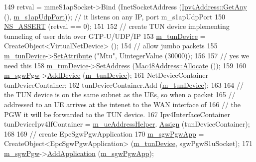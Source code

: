\begin{DoxyCode}
149   retval = mmeS1apSocket->Bind (InetSocketAddress (\hyperlink{classns3_1_1Ipv4Address_a7a39b330c8e701183a411d5779fca1a4}{Ipv4Address::GetAny} (), 
      \hyperlink{classns3_1_1EmuEpcHelper_a40b9bb46dee69ea02ffe0722b462db8e}{m\_s1apUdpPort})); \textcolor{comment}{// it listens on any IP, port m\_s1apUdpPort}
150   \hyperlink{assert_8h_a6dccdb0de9b252f60088ce281c49d052}{NS\_ASSERT} (retval == 0);
151 
152   \textcolor{comment}{// create TUN device implementing tunneling of user data over GTP-U/UDP/IP }
153   \hyperlink{classns3_1_1EmuEpcHelper_ababd4c0bb2cb44e0194c852e6411b501}{m\_tunDevice} = CreateObject<VirtualNetDevice> ();
154   \textcolor{comment}{// allow jumbo packets}
155   \hyperlink{classns3_1_1EmuEpcHelper_ababd4c0bb2cb44e0194c852e6411b501}{m\_tunDevice}->\hyperlink{classns3_1_1ObjectBase_ac60245d3ea4123bbc9b1d391f1f6592f}{SetAttribute} (\textcolor{stringliteral}{"Mtu"}, UintegerValue (30000));
156 
157   \textcolor{comment}{// yes we need this}
158   \hyperlink{classns3_1_1EmuEpcHelper_ababd4c0bb2cb44e0194c852e6411b501}{m\_tunDevice}->\hyperlink{classns3_1_1VirtualNetDevice_a560887abe97f9327f2973d748aa382e9}{SetAddress} (\hyperlink{classns3_1_1Mac48Address_a203b53c035649c0d4881fa1115aa2cdb}{Mac48Address::Allocate} ()); 
159 
160   \hyperlink{classns3_1_1EmuEpcHelper_a5c68f673b82b8c80b5fb88ae986f8cea}{m\_sgwPgw}->\hyperlink{classns3_1_1Node_a42ff83ee1d5d1649c770d3f5b62375de}{AddDevice} (\hyperlink{classns3_1_1EmuEpcHelper_ababd4c0bb2cb44e0194c852e6411b501}{m\_tunDevice});
161   NetDeviceContainer tunDeviceContainer;
162   tunDeviceContainer.Add (\hyperlink{classns3_1_1EmuEpcHelper_ababd4c0bb2cb44e0194c852e6411b501}{m\_tunDevice});
163   
164   \textcolor{comment}{// the TUN device is on the same subnet as the UEs, so when a packet}
165   \textcolor{comment}{// addressed to an UE arrives at the intenet to the WAN interface of}
166   \textcolor{comment}{// the PGW it will be forwarded to the TUN device. }
167   Ipv4InterfaceContainer tunDeviceIpv4IfContainer = \hyperlink{classns3_1_1EmuEpcHelper_ab57fc887c64c3f3aec6516957a84275d}{m\_ueAddressHelper}.
      \hyperlink{classns3_1_1Ipv4AddressHelper_af8e7f4a1a7e74c00014a1eac445a27af}{Assign} (tunDeviceContainer);  
168 
169   \textcolor{comment}{// create EpcSgwPgwApplication}
170   \hyperlink{classns3_1_1EmuEpcHelper_a9f3619ec9e8725d4fbb9794a4f21aaa4}{m\_sgwPgwApp} = CreateObject<EpcSgwPgwApplication> (\hyperlink{classns3_1_1EmuEpcHelper_ababd4c0bb2cb44e0194c852e6411b501}{m\_tunDevice}, sgwPgwS1uSocket);
171   \hyperlink{classns3_1_1EmuEpcHelper_a5c68f673b82b8c80b5fb88ae986f8cea}{m\_sgwPgw}->\hyperlink{classns3_1_1Node_ab98b4fdc4aadc86366b80e8a79a53f47}{AddApplication} (\hyperlink{classns3_1_1EmuEpcHelper_a9f3619ec9e8725d4fbb9794a4f21aaa4}{m\_sgwPgwApp});

\end{DoxyCode}

